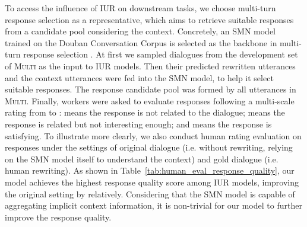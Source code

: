 \documentclass[11pt,a4paper]{article}
\begin{document}
To access the influence of IUR on downstream tasks, we choose multi-turn response selection as a representative, which aims to retrieve suitable responses from a candidate pool considering the context. Concretely, an SMN model trained on the Douban Conversation Corpus is selected as the backbone in multi-turn response selection \cite{wu-etal-2017-sequential}. At first we sampled  dialogues from the development set of \textsc{Multi} as the input to IUR models. Then their predicted rewritten utterances and the context utterances were fed into the SMN model, to help it select suitable responses. The response candidate pool was formed by all utterances in \textsc{Multi}. Finally,  workers were asked to evaluate responses following a multi-scale rating from  to :  means the response is not related to the dialogue;  means the response is related but not interesting enough; and  means the response is satisfying. To illustrate more clearly, we also conduct human rating evaluation on responses under the settings of original dialogue (i.e. without rewriting, relying on the SMN model itself to understand the context) and gold dialogue (i.e. human rewriting). As shown in Table~\ref{tab:human_eval_response_quality}, our model achieves the highest response quality score among IUR models, improving the original setting by  relatively. Considering that the SMN model is capable of aggregating implicit context information, it is non-trivial for our model to further improve the response quality.

\begin{table}[t]
    \centering
    \caption{The ablation results on the development set of \textsc{Multi}. ``w/o Edit'' means directly using the current utterance as the rewritten utterance. ``w/o U-shape seg.'' means that our segmentation layer is replaced by a feed-forward neural network with comparable parameters. The remaining variants ablate different similarity functions in the encoding layer.}
    \label{tab:ablation_result}
\end{table}
\end{document}
